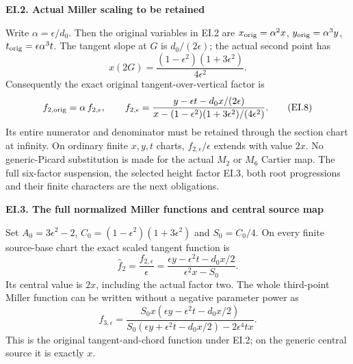 \medskip\noindent\textbf{EI.2. Actual Miller scaling to be retained}

\par\nobreak

Write \(\alpha=\epsilon/d_0\). Then the original variables in EI.2
are \(x_{\rm orig}=\alpha^2x\),
\(y_{\rm orig}=\alpha^3y\),
\(t_{\rm orig}=\epsilon\alpha^3t\).
The tangent slope at \(G\) is \(d_0/(2\epsilon)\); the actual
second point has
\[
 x(2G)=\frac{(1-\epsilon^2)(1+3\epsilon^2)}
                  {4\epsilon^2}.
 \tag{EI.7}
\]
Consequently the exact original tangent-over-vertical factor is
\[
 f_{2,\rm orig}
   =\alpha\,f_{2,\epsilon},\qquad
 f_{2,\epsilon}
   =\frac{y-\epsilon t-d_0x/(2\epsilon)}
          {x-(1-\epsilon^2)(1+3\epsilon^2)/(4\epsilon^2)}.
 \tag{EI.8}
\]
Its entire numerator and denominator must be retained through the
section chart at infinity. On ordinary finite \(x,y,t\) charts,
\(f_{2,\epsilon}/\epsilon\) extends with value \(2x\).
No generic-Picard substitution is made for the actual \(M_2\) or
\(M_6\) Cartier map. The full six-factor suspension, the selected
height factor EI.3, both root progressions and their finite
characters are the next obligations.

\par

\medskip\noindent\textbf{EI.3. The full normalized Miller functions and central source map}

\par\nobreak

Set \(A_0=3\epsilon^2-2\), \(C_0=(1-\epsilon^2)(1+3\epsilon^2)\)
and \(S_0=C_0/4\). On every finite source-base chart the exact
scaled tangent function is
\[
 \widehat f_2=\frac{f_{2,\epsilon}}{\epsilon}
 =\frac{\epsilon y-\epsilon^2t-d_0x/2}
              {\epsilon^2x-S_0}.
 \tag{EI.9}
\]
Its central value is \(2x\), including the actual factor two.
The whole third-point Miller function can be written without a
negative parameter power as
\[
 f_{3,\epsilon}
 =\frac{S_0x(\epsilon y-\epsilon^2t-d_0x/2)}
 {S_0(\epsilon y+\epsilon^2t-d_0x/2)-2\epsilon^4tx}.
 \tag{EI.10}
\]
This is the original tangent-and-chord function under EI.2;
on the generic central source it is exactly \(x\).

